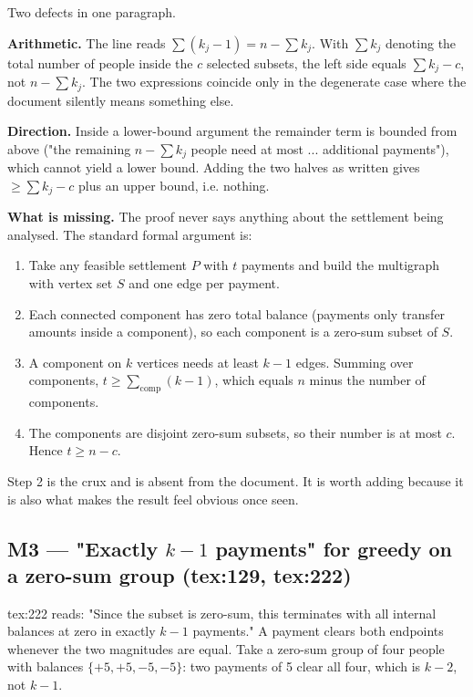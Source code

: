\documentclass[11pt]{article}
\begin{document}
Two defects in one paragraph.

\textbf{Arithmetic.} The line reads
$\sum (k_j - 1) = n - \sum k_j$. With $\sum k_j$ denoting the total number of people inside the $c$
selected subsets, the left side equals $\sum k_j - c$, not $n - \sum k_j$. The two expressions coincide
only in the degenerate case where the document silently means something else.

\textbf{Direction.} Inside a lower-bound argument the remainder term is bounded from above ("the remaining
$n - \sum k_j$ people need at most ... additional payments"), which cannot yield a lower bound. Adding
the two halves as written gives $\ge \sum k_j - c$ plus an upper bound, i.e. nothing.

\textbf{What is missing.} The proof never says anything about the settlement being analysed. The standard
formal argument is:

\begin{enumerate}
  \item Take any feasible settlement $P$ with $t$ payments and build the multigraph with vertex set $S$
and one edge per payment.
  \item Each connected component has zero total balance (payments only transfer amounts inside a component),
so each component is a zero-sum subset of $S$.
  \item A component on $k$ vertices needs at least $k-1$ edges. Summing over components,
$t \ge \sum_{\text{comp}} (k-1)$, which equals $n$ minus the number of components.
  \item The components are disjoint zero-sum subsets, so their number is at most $c$. Hence $t \ge n - c$.
\end{enumerate}

Step 2 is the crux and is absent from the document. It is worth adding because it is also what makes the
result feel obvious once seen.

\subsection{M3 --- "Exactly $k-1$ payments" for greedy on a zero-sum group (tex:129, tex:222)}

tex:222 reads: "Since the subset is zero-sum, this terminates with all internal balances at zero in
exactly $k-1$ payments." A payment clears both endpoints whenever the two magnitudes are equal. Take
a zero-sum group of four people with balances $\{+5, +5, -5, -5\}$: two payments of 5 clear all four,
which is $k-2$, not $k-1$.
\end{document}
